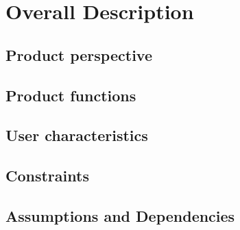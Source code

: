 \section{Overall Description} \label{sec:description}

\subsection{Product perspective} \label{subsec:prod_persp}



\subsection{Product functions} \label{subsec:prod_funct}


\subsection{User characteristics} \label{subsec:user_char}


\subsection{Constraints} \label{subsec:constraints}


\subsection{Assumptions and Dependencies} \label{subsec:dependencies}


